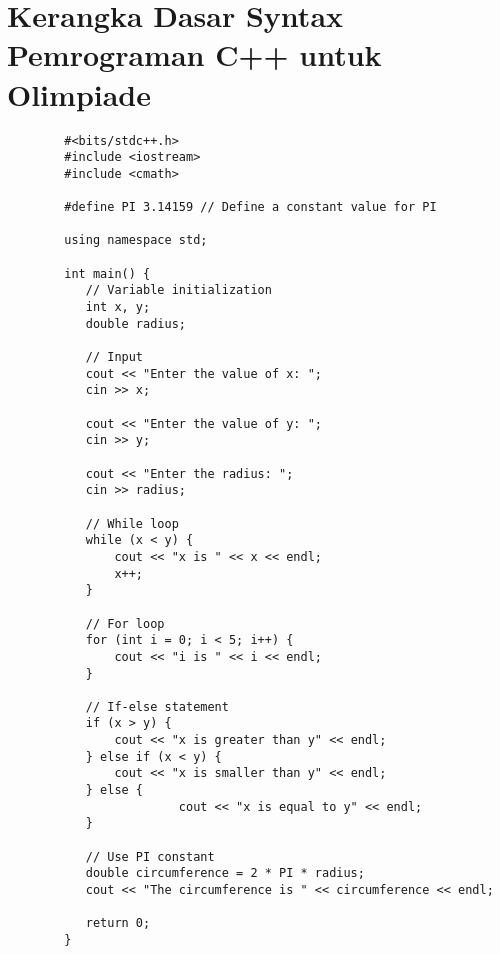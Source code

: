\section{Kerangka Dasar Syntax Pemrograman C++ untuk Olimpiade}
	\begin{lstlisting}
		#<bits/stdc++.h>
		#include <iostream>
		#include <cmath>
		
		#define PI 3.14159 // Define a constant value for PI
		
		using namespace std;
		
		int main() {
		   // Variable initialization
		   int x, y;
		   double radius;
				
		   // Input
		   cout << "Enter the value of x: ";
		   cin >> x;
				
		   cout << "Enter the value of y: ";
		   cin >> y;
				
		   cout << "Enter the radius: ";
		   cin >> radius;
				
		   // While loop
		   while (x < y) {
		       cout << "x is " << x << endl;
		       x++;
		   }
				
		   // For loop
		   for (int i = 0; i < 5; i++) {
		       cout << "i is " << i << endl;
		   }
				
		   // If-else statement
		   if (x > y) {
		       cout << "x is greater than y" << endl;
		   } else if (x < y) {
		       cout << "x is smaller than y" << endl;
		   } else {
				    	cout << "x is equal to y" << endl;
		   }
				
		   // Use PI constant
		   double circumference = 2 * PI * radius;
		   cout << "The circumference is " << circumference << endl;
				
		   return 0;
		}
		\end{lstlisting}